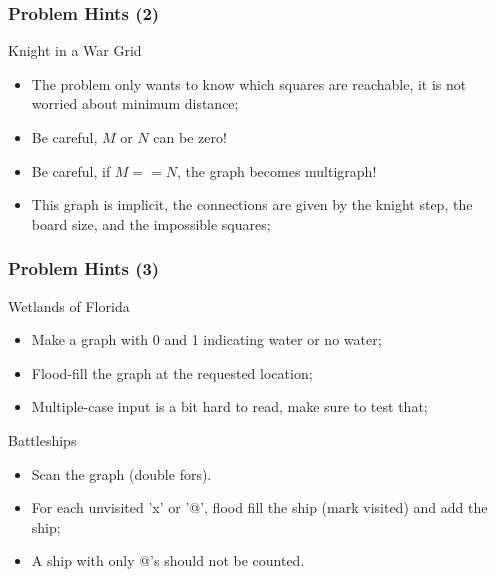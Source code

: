\begin{frame}
  \frametitle{Problem Hints (2)}
  {\smaller
  \begin{block}{Knight in a War Grid}
    \begin{itemize}
    \item The problem only wants to know which squares are reachable,
      it is not worried about minimum distance;
    \item Be careful, $M$ or $N$ can be zero!
    \item Be careful, if $M == N$, the graph becomes multigraph!
    \item This graph is implicit, the connections are given by the
      knight step, the board size, and the impossible squares;
    \end{itemize}
  \end{block}
  }
\end{frame}

\begin{frame}
  \frametitle{Problem Hints (3)}
  {\smaller
  \begin{block}{Wetlands of Florida}
    \begin{itemize}
      \item Make a graph with 0 and 1 indicating water or no water;
      \item Flood-fill the graph at the requested location;
      \item Multiple-case input is a bit hard to read, make sure to test that;
    \end{itemize}
  \end{block}
  \begin{block}{Battleships}
    \begin{itemize}
      \item Scan the graph (double fors). 
      \item For each unvisited 'x' or '@', flood fill the ship (mark
        visited) and add the ship;
      \item A ship with only @'s should not be counted.
    \end{itemize}
  \end{block}}
\end{frame}

